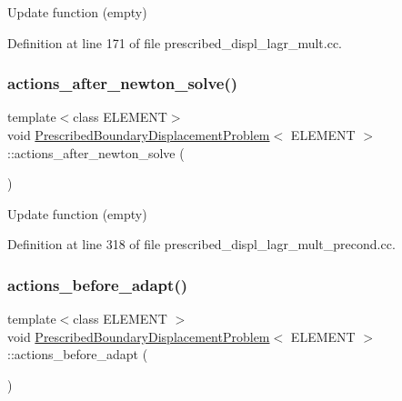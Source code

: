 Update function (empty) 



Definition at line 171 of file prescribed\+\_\+displ\+\_\+lagr\+\_\+mult.\+cc.

\mbox{\label{classPrescribedBoundaryDisplacementProblem_a53e7d18d9d748388160d6c4106f1d493}} 
\subsubsection{\texorpdfstring{actions\+\_\+after\+\_\+newton\+\_\+solve()}{actions\_after\_newton\_solve()}\hspace{0.1cm}{\footnotesize\ttfamily [3/3]}}
{\footnotesize\ttfamily template$<$class E\+L\+E\+M\+E\+NT$>$ \\
void \hyperlink{classPrescribedBoundaryDisplacementProblem}{Prescribed\+Boundary\+Displacement\+Problem}$<$ E\+L\+E\+M\+E\+NT $>$\+::actions\+\_\+after\+\_\+newton\+\_\+solve (\begin{DoxyParamCaption}{ }\end{DoxyParamCaption})\hspace{0.3cm}{\ttfamily [inline]}}



Update function (empty) 



Definition at line 318 of file prescribed\+\_\+displ\+\_\+lagr\+\_\+mult\+\_\+precond.\+cc.

\mbox{\label{classPrescribedBoundaryDisplacementProblem_a2e9f335e8680b0f2338b579e37e9d38a}} 
\subsubsection{\texorpdfstring{actions\+\_\+before\+\_\+adapt()}{actions\_before\_adapt()}\hspace{0.1cm}{\footnotesize\ttfamily [1/2]}}
{\footnotesize\ttfamily template$<$class E\+L\+E\+M\+E\+NT $>$ \\
void \hyperlink{classPrescribedBoundaryDisplacementProblem}{Prescribed\+Boundary\+Displacement\+Problem}$<$ E\+L\+E\+M\+E\+NT $>$\+::actions\+\_\+before\+\_\+adapt (\begin{DoxyParamCaption}{ }\end{DoxyParamCaption})}



